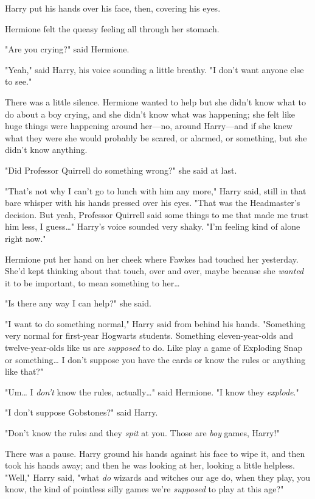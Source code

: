 Harry put his hands over his face, then, covering his eyes.

Hermione felt the queasy feeling all through her stomach.

"Are you crying?" said Hermione.

"Yeah," said Harry, his voice sounding a little breathy. "I don't want anyone 
else to see."

There was a little silence. Hermione wanted to help but she didn't know what to 
do about a boy crying, and she didn't know what was happening; she felt like 
huge things were happening around her---no, around Harry---and if she knew what 
they were she would probably be scared, or alarmed, or something, but she 
didn't know anything.

"Did Professor Quirrell do something wrong?" she said at last.

"That's not why I can't go to lunch with him any more," Harry said, still in 
that bare whisper with his hands pressed over his eyes. "That was the 
Headmaster's decision. But yeah, Professor Quirrell said some things to me that 
made me trust him less, I guess{\ldots}" Harry's voice sounded very shaky. "I'm 
feeling kind of alone right now."

Hermione put her hand on her cheek where Fawkes had touched her yesterday. 
She'd kept thinking about that touch, over and over, maybe because she 
\emph{wanted} it to be important, to mean something to her{\ldots}

"Is there any way I can help?" she said.

"I want to do something normal," Harry said from behind his hands. "Something 
very normal for first-year Hogwarts students. Something eleven-year-olds and 
twelve-year-olds like us are \emph{supposed} to do. Like play a game of 
Exploding Snap or something{\ldots} I don't suppose you have the cards or know 
the rules or anything like that?"

"Um{\ldots} I \emph{don't} know the rules, actually{\ldots}" said Hermione. "I 
know they \emph{explode}."

"I don't suppose Gobstones?" said Harry.

"Don't know the rules and they \emph{spit} at you. Those are \emph{boy} games, 
Harry!"

There was a pause. Harry ground his hands against his face to wipe it, and then 
took his hands away; and then he was looking at her, looking a little helpless. 
"Well," Harry said, "what \emph{do} wizards and witches our age do, when they 
play, you know, the kind of pointless silly games we're \emph{supposed} to play 
at this age?"

